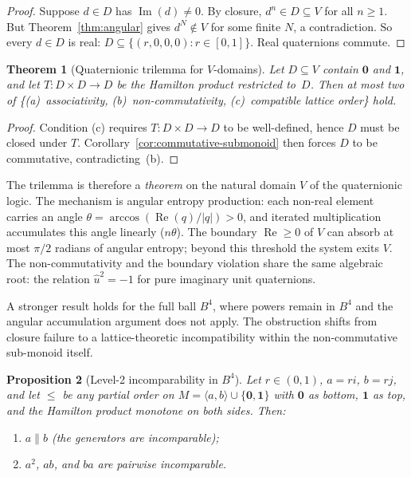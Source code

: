 \documentclass[11pt,a4paper]{article}
\newtheorem{theorem}{Theorem}
\newtheorem{proposition}[theorem]{Proposition}
\newcommand{\Real}{\operatorname{Re}}
\newcommand{\Imag}{\operatorname{Im}}
\begin{document}
\begin{proof}
Suppose $d \in D$ has $\Imag(d) \neq 0$. By closure, $d^n \in D
\subseteq V$ for all $n \geq 1$. But Theorem~\ref{thm:angular}
gives $d^N \notin V$ for some finite $N$, a contradiction. So every
$d \in D$ is real: $D \subseteq \{(r,0,0,0) : r \in [0,1]\}$.
Real quaternions commute.
\end{proof}

\begin{theorem}[Quaternionic trilemma for $V$-domains]
\label{thm:trilemma-V}
Let $D \subseteq V$ contain $\mathbf{0}$ and $\mathbf{1}$, and let
$T \colon D \times D \to D$ be the Hamilton product restricted
to~$D$. Then at most two of \{(a)~associativity,
(b)~non-commutativity, (c)~compatible lattice order\} hold.
\end{theorem}

\begin{proof}
Condition (c) requires $T \colon D \times D \to D$ to be
well-defined, hence $D$ must be closed under $T$.
Corollary~\ref{cor:commutative-submonoid} then forces $D$ to be
commutative, contradicting~(b).
\end{proof}

The trilemma is therefore a \emph{theorem} on the natural domain
$V$ of the quaternionic logic. The mechanism is angular entropy
production: each non-real element carries an angle
$\theta = \arccos(\Real(q)/|q|) > 0$, and iterated multiplication
accumulates this angle linearly ($n\theta$). The boundary $\Real
\geq 0$ of $V$ can absorb at most $\pi/2$ radians of angular
entropy; beyond this threshold the system exits $V$. The
non-commutativity and the boundary violation share the same algebraic
root: the relation $\hat{u}^2 = -1$ for pure imaginary unit
quaternions.

A stronger result holds for the full ball $B^4$, where powers remain
in $B^4$ and the angular accumulation argument does not apply.
The obstruction shifts from closure failure to a lattice-theoretic
incompatibility within the non-commutative sub-monoid itself.

\begin{proposition}[Level-2 incomparability in $B^4$]
\label{prop:level2-incomparable}
Let $r \in (0,1)$, $a = ri$, $b = rj$, and let $\leq$ be any
partial order on $M = \langle a, b \rangle \cup \{\mathbf{0},
\mathbf{1}\}$ with $\mathbf{0}$ as bottom, $\mathbf{1}$ as top,
and the Hamilton product monotone on both sides. Then:
\begin{enumerate}[label=\textup{(\alph*)},nosep]
\item $a \| b$ \textup{(}the generators are incomparable\textup{)};
\item $a^2$, $ab$, and $ba$ are pairwise incomparable.
\end{enumerate}
\end{proposition}
\end{document}
